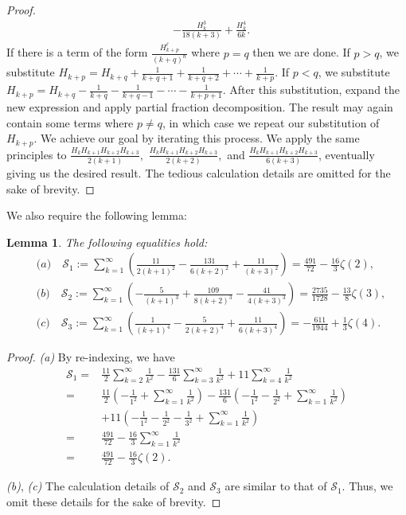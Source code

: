 \documentclass[10pt]{amsart}
\newtheorem{lemma}{Lemma}
\theoremstyle{definition}
\begin{document}
\begin{proof}
\begin{align*}
        &-\frac{H_k^3}{18 (k+3)} + \frac{H_k^4}{6k}.
    \end{align*}
    If there is a term of the form $\frac{H^\ell_{k+p}}{(k+q)^n}$ where $p=q$ then we are done. If $p>q$, we substitute $H_{k+p}=H_{k+q} + \frac{1}{k+q+1} + \frac{1}{k+q+2} + \cdots + \frac{1}{k+p}$. If $p<q$, we substitute $H_{k+p}=H_{k+q} - \frac{1}{k+q} - \frac{1}{k+q-1} - \cdots - \frac{1}{k+p+1}$. After this substitution, expand the new expression and apply partial fraction decomposition. The result may again contain some terms where $p\neq q$, in which case we repeat our substitution of $H_{k+p}$. We achieve our goal by iterating this process. We apply the same principles to $\frac{H_k H_{k+1} H_{k+2} H_{k+3}}{2 (k+1)},$ $ \frac{H_k H_{k+1} H_{k+2} H_{k+3}}{2 (k+2)},$ and $\frac{H_k H_{k+1} H_{k+2} H_{k+3}}{6 (k+3)}$, eventually giving us the desired result. The tedious calculation details are omitted for the sake of brevity.
\end{proof}
We also require the following lemma:
\begin{lemma} \label{ReIndexZetaLemma}
    The following equalities hold:
    \begin{align*}
        &\textit{(a)}\quad \mathcal{S}_1 := \sum_{k=1}^\infty \left(\frac{11}{2 (k+1)^2} - \frac{131}{6 (k+2)^2} + \frac{11}{(k+3)^2}\right) = \frac{491}{72} - \frac{16}{3}\zeta(2),\\
        &\textit{(b)}\quad \mathcal{S}_2 := \sum_{k=1}^\infty \left(- \frac{5}{(k+1)^3} + \frac{109}{8 (k+2)^3} -\frac{41}{4 (k+3)^3}\right) = \frac{2735}{1728}-\frac{13}{8}\zeta(3),\\
        &\textit{(c)}\quad \mathcal{S}_3 := \sum_{k=1}^\infty \left(\frac{1}{(k+1)^4} - \frac{5}{2 (k+2)^4} + \frac{11}{6 (k+3)^4}\right) = -\frac{611}{1944} + \frac{1}{3}\zeta(4).
    \end{align*}
\end{lemma}
\begin{proof}
    \textit{(a)} By re-indexing, we have
    \begin{align*}
        \mathcal{S}_1
        =& \frac{11}{2}\sum_{k=2}^\infty \frac{1}{k^2} - \frac{131}{6}\sum_{k=3}^\infty \frac{1}{k^2} + 11\sum_{k=4}^\infty \frac{1}{k^2}\\
        =& \frac{11}{2}\left(-\frac{1}{1^2} + \sum_{k=1}^\infty \frac{1}{k^2}\right) - \frac{131}{6}\left(-\frac{1}{1^2} - \frac{1}{2^2} + \sum_{k=1}^\infty \frac{1}{k^2}\right)\\
        &+ 11\left(-\frac{1}{1^2} - \frac{1}{2^2} - \frac{1}{3^2} + \sum_{k=1}^\infty \frac{1}{k^2}\right)\\
        =& \frac{491}{72} - \frac{16}{3}\sum_{k=1}^\infty \frac{1}{k^2}\\
        =& \frac{491}{72} - \frac{16}{3}\zeta(2).
    \end{align*}

    \noindent
    \textit{(b)}, \textit{(c)} The calculation details of $\mathcal{S}_2$ and $\mathcal{S}_3$ are similar to that of $\mathcal{S}_1$. Thus, we omit these details for the sake of brevity.
\end{proof}
\end{document}
